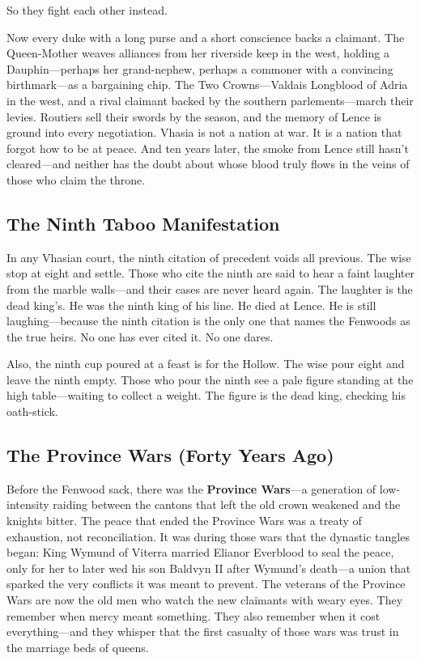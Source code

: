 So they fight each other instead.

Now every duke with a long purse and a short conscience backs a claimant. The Queen-Mother weaves alliances from her riverside keep in the west, holding a Dauphin---perhaps her grand-nephew, perhaps a commoner with a convincing birthmark---as a bargaining chip. The Two Crowns---Valdais Longblood of Adria in the west, and a rival claimant backed by the southern parlements---march their levies. Routiers sell their swords by the season, and the memory of Lence is ground into every negotiation. Vhasia is not a nation at war. It is a nation that forgot how to be at peace. And ten years later, the smoke from Lence still hasn't cleared---and neither has the doubt about whose blood truly flows in the veins of those who claim the throne.

\subsection*{The Ninth Taboo Manifestation}
\begin{tcolorbox}[colback=black!3,colframe=red!60!black,title=The Ninth Taboo,breakable]
In any Vhasian court, the ninth citation of precedent voids all previous. The wise stop at eight and settle. Those who cite the ninth are said to hear a faint laughter from the marble walls---and their cases are never heard again. The laughter is the dead king's. He was the ninth king of his line. He died at Lence. He is still laughing---because the ninth citation is the only one that names the Fenwoods as the true heirs. No one has ever cited it. No one dares.

Also, the ninth cup poured at a feast is for the Hollow. The wise pour eight and leave the ninth empty. Those who pour the ninth see a pale figure standing at the high table---waiting to collect a weight. The figure is the dead king, checking his oath-stick.
\end{tcolorbox}

\subsection*{The Province Wars (Forty Years Ago)}

Before the Fenwood sack, there was the \textbf{Province Wars}---a generation of low-intensity raiding between the cantons that left the old crown weakened and the knights bitter. The peace that ended the Province Wars was a treaty of exhaustion, not reconciliation. It was during those wars that the dynastic tangles began: King Wymund of Viterra married Elianor Everblood to seal the peace, only for her to later wed his son Baldvyn II after Wymund's death---a union that sparked the very conflicts it was meant to prevent. The veterans of the Province Wars are now the old men who watch the new claimants with weary eyes. They remember when mercy meant something. They also remember when it cost everything---and they whisper that the first casualty of those wars was trust in the marriage beds of queens.

